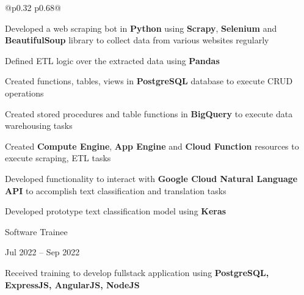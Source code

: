 \documentclass[a4paper,10pt]{article}
\begin{document}
\begin{tabularx}{\textwidth}{@{}p{0.32\textwidth} p{0.68\textwidth}@{}}
\begin{minipage}[t]{\linewidth}
\begin{experiencelist}[after=\vspace{0.2pt}]
\item Developed a web scraping bot in \textbf{Python} using \textbf{Scrapy}, \textbf{Selenium} and \textbf{BeautifulSoup} library to collect data from various websites regularly
\item Defined ETL logic over the extracted data using \textbf{Pandas}
\item Created functions, tables, views in \textbf{PostgreSQL} database to execute CRUD operations
\item Created stored procedures and table functions in \textbf{BigQuery} to execute data warehousing tasks
\item Created \textbf{Compute Engine}, \textbf{App Engine} and \textbf{Cloud Function} resources to execute scraping, ETL tasks
\item Developed functionality to interact with \textbf{Google Cloud Natural Language API} to accomplish text classification and translation tasks
\item Developed prototype text classification model using \textbf{Keras}

\end{experiencelist}

\vspace{6pt}

Software Trainee

Jul 2022 -- Sep 2022

\begin{experiencelist}

\item Received training to develop fullstack application using \textbf{PostgreSQL,\\ ExpressJS, AngularJS, NodeJS}

\end{experiencelist}

\end{minipage}

\end{tabularx}
\end{document}
